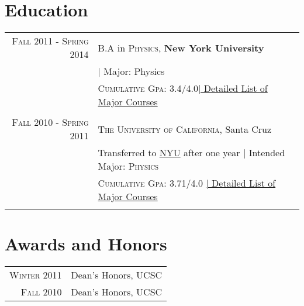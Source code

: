 \documentclass[a4paper,10pt]{article} %
\begin{document}
\section{Education}
\hypertarget{nyu}{}	
\begin{tabular}{rl}
\textsc{Fall} 2011 - \textsc{Spring} 2014 & B.A in \textsc{Physics},
\textbf{New York University}\\
&| Major: Physics\\
&\normalsize \textsc{Cumulative Gpa}: 3.4/4.0\hyperlink{grds}{\hfill |
  \footnotesize Detailed List of Major Courses}\\
&\\


\textsc{Fall} 2010 - \textsc{Spring} 2011& \textsc{The University of
  California}, Santa Cruz \\
& Transferred to \hyperlink{nyu}{NYU} after one year | \small Intended
Major: \textsc{Physics} \\
&\normalsize \textsc{Cumulative Gpa}: 3.71/4.0 \hyperlink{grds_ucsc}{\hfill|
  \footnotesize Detailed List of Major Courses}\\
&\\




\end{tabular}


\section{Awards and Honors}

\begin{tabular}{rl}
\textsc{Winter} 2011 & Dean's Honors, UCSC \\

\textsc{Fall} 2010 & Dean's Honors, UCSC \\
\end{tabular}
\end{document}
